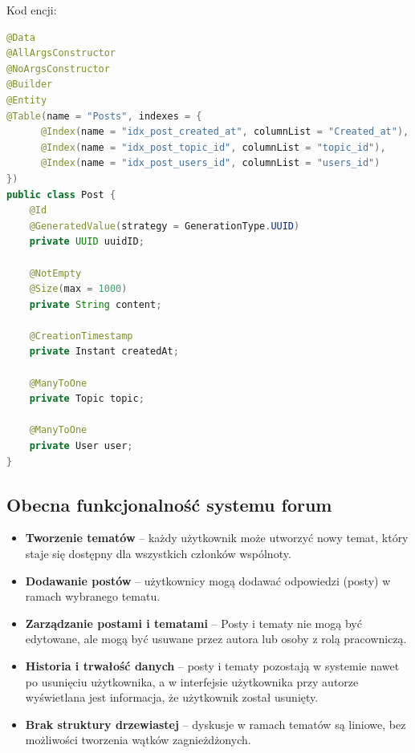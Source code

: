 Kod encji:
\begin{lstlisting}[language=Java, style=JavaStyle, caption=Encja \texttt{Post}]
@Data
@AllArgsConstructor
@NoArgsConstructor
@Builder
@Entity
@Table(name = "Posts", indexes = {
      @Index(name = "idx_post_created_at", columnList = "Created_at"),
      @Index(name = "idx_post_topic_id", columnList = "topic_id"),
      @Index(name = "idx_post_users_id", columnList = "users_id")
})
public class Post {
    @Id
    @GeneratedValue(strategy = GenerationType.UUID)
    private UUID uuidID;

    @NotEmpty
    @Size(max = 1000)
    private String content;

    @CreationTimestamp
    private Instant createdAt;

    @ManyToOne
    private Topic topic;

    @ManyToOne
    private User user;
}
\end{lstlisting}

\subsection{Obecna funkcjonalność systemu forum}
\begin{itemize}
    \item \textbf{Tworzenie tematów} -- każdy użytkownik może utworzyć nowy temat, który staje się dostępny dla wszystkich członków wspólnoty.
    \item \textbf{Dodawanie postów} -- użytkownicy mogą dodawać odpowiedzi (posty) w ramach wybranego tematu.
    \item \textbf{Zarządzanie postami i tematami} -- Posty i tematy nie mogą być edytowane, ale mogą być usuwane przez autora lub osoby z rolą pracowniczą.
    \item \textbf{Historia i trwałość danych} -- posty i tematy pozostają w systemie nawet po usunięciu użytkownika, a w interfejsie użytkownika przy autorze wyświetlana jest informacja, że użytkownik został usunięty.
    \item \textbf{Brak struktury drzewiastej} -- dyskusje w ramach tematów są liniowe, bez możliwości tworzenia wątków zagnieżdżonych.
\end{itemize}

